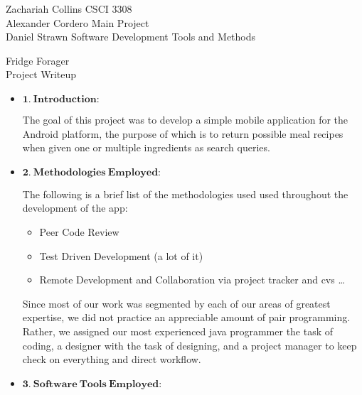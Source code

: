 \documentclass[a4paper,11pt]{article}
\begin{document}
\noindent
Zachariah Collins	\hfill CSCI 3308 \\
Alexander Cordero	\hfill Main Project \\
Daniel Strawn		\hfill Software Development Tools and Methods \\

\begin{center}
\LARGE
Fridge Forager
\\
\Large
Project Writeup
\end{center}

\begin{itemize}
\large
\item $\mathbf{1.\ Introduction:}$

\parindent 30pt
The goal of this project was to develop a simple mobile application for the Android platform, the purpose of which is to return possible meal recipes when given one or multiple ingredients as search queries.
\

\item $\mathbf{2.\ Methodologies\ Employed:}$

\parindent 30pt
The following is a brief list of the methodologies used used throughout the development of the app:
\begin{itemize}
\item Peer Code Review
\item Test Driven Development (a lot of it)
\item Remote Development and Collaboration via project tracker and cvs \ldots
\end{itemize}
Since most of our work was segmented by each of our areas of greatest expertise, we did not practice an appreciable amount of pair programming. 
Rather, we assigned our most experienced java programmer the task of coding, a designer with the task of designing, and a project manager to keep check on everything and direct workflow.

\newpage
\item $\mathbf{3.\ Software\ Tools\ Employed:}$


\end{itemize}
\end{document}
